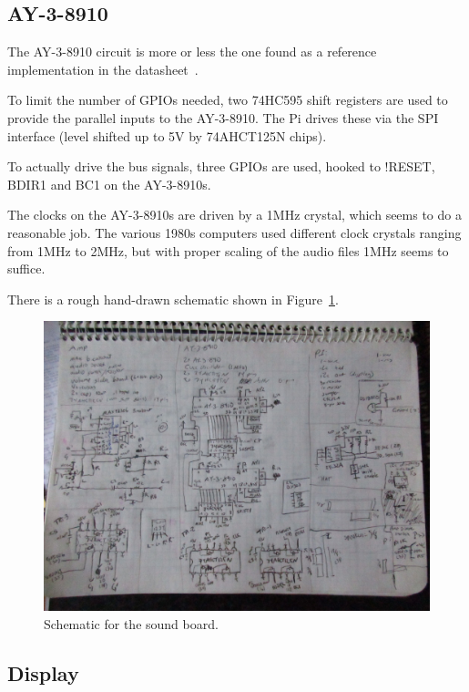 \documentclass[11pt]{article}
\begin{document}
\subsection{AY-3-8910}

The AY-3-8910 circuit is more or less the one found as a reference
implementation in the datasheet~\cite{ay38910}.

To limit the number of GPIOs needed, two 74HC595 shift registers are used
to provide the parallel inputs to the AY-3-8910.
The Pi drives these via the SPI interface (level shifted up to 5V
by 74AHCT125N chips).

To actually drive the bus signals, three GPIOs are used, hooked to
!RESET, BDIR1 and BC1 on the AY-3-8910s.

The clocks on the AY-3-8910s are driven by a 1MHz crystal, which seems
to do a reasonable job.
The various 1980s computers used different clock crystals ranging from
1MHz to 2MHz, but with proper scaling of the audio files 1MHz seems
to suffice.

There is a rough hand-drawn schematic shown in Figure~\ref{figure:schematic}.

\begin{figure}[tph]
\centering
\includegraphics[angle=90,width=\columnwidth]{figs/0380_schematic.jpg}
\caption{Schematic for the sound board.~\label{figure:schematic}}
\end{figure}

\subsection{Display}
\end{document}
